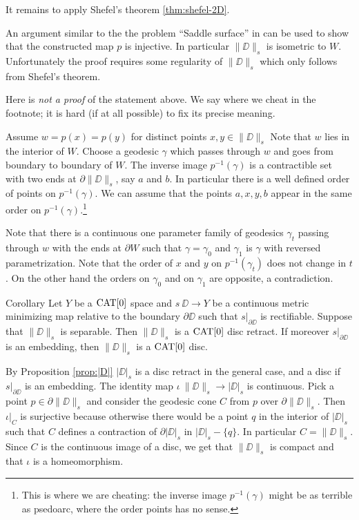 \documentclass{article}
\begin{document}
It remains to apply Shefel's theorem \ref{thm:shefel-2D}.


\qeds



An argument similar to the the problem ``Saddle surface'' in \cite{petrunin-orthodox} can be used to show that the constructed map $p$ is injective. 
In particular $\|\DD\|_s$ is isometric to $W$.
Unfortunately the proof requires some regularity of $\|\DD\|_s$ which only follows from Shefel's theorem. 

Here is \emph{not a proof} of the statement above.
We say where we cheat in the footnote; 
it is hard (if at all possible) to fix its precise meaning.

 Assume  $w=p(x)=p(y)$ for distinct points $x,y\in\|\DD\|_s$
Note that  $w$ lies in the interior of $W$.
Choose a geodesic $\gamma$ which passes through $w$ and goes 
from boundary to boundary of $W$.
The inverse image $p^{-1}(\gamma)$ is a contractible set with two ends at $\partial\|\DD\|_s$, say $a$ and $b$.
In particular there is a well defined order of  points on $p^{-1}(\gamma)$.
We can assume that the points $a,x,y,b$ appear in the same order on $p^{-1}(\gamma)$.\footnote{This is where we are cheating: the inverse image $p^{-1}(\gamma)$ might be as terrible as psedoarc, where the order points has no sense.}

Note that there is a continuous one parameter family of geodesics $\gamma_t$ passing through $w$ with the ends at $\partial W$
such that $\gamma=\gamma_0$ and $\gamma_1$ is $\gamma$ with reversed parametrization.
Note that the order of $x$ and $y$ on $p^{-1}(\gamma_t)$ does not change in $t$.
On the other hand the orders on $\gamma_0$ and on $\gamma_1$ are opposite, a contradiction.\qeds 

\begin{thm}{Corollary}\label{cor:main}
Let $Y$ be a $\mathop{\rm CAT}\nolimits[0]$ space 
and $s\:\DD\to Y$ be a continuous metric minimizing map relative to the boundary $\partial\DD$ such that $s|_{\partial\DD}$ is rectifiable.
Suppose that $\|\DD\|_s$  is separable. Then $\|\DD\|_s$ is a $\mathop{\rm CAT}\nolimits[0]$ disc retract. 
If moreover  $s|_{\partial\DD}$ is an embedding,
then $\|\DD\|_s$ is a $\mathop{\rm CAT}\nolimits[0]$ disc.
\end{thm}

By Proposition \ref{prop:|D|} $|\DD|_s$ is a disc retract in the general case, and a disc if $s|_{\partial\DD}$ is an embedding.
The identity map $\iota\:\|\DD\|_s\to |\DD|_s$ is continuous. Pick a point $p\in\partial\|\DD\|_s$ and consider the geodesic 
cone $C$ from $p$ over $\partial\|\DD\|_s$. Then $\iota|_C$ is surjective because otherwise there would be a point $q$ in the 
interior of $|\DD|_s$ such that $C$ defines a contraction of $\partial|\DD|_s$ in $|\DD|_s-\{q\}$. 
In particular $C=\|\DD\|_s$.
Since $C$ is the continuous image of a disc, we get that $\|\DD\|_s$ is compact and that $\iota$ is a homeomorphism.
\qeds
\end{document}
